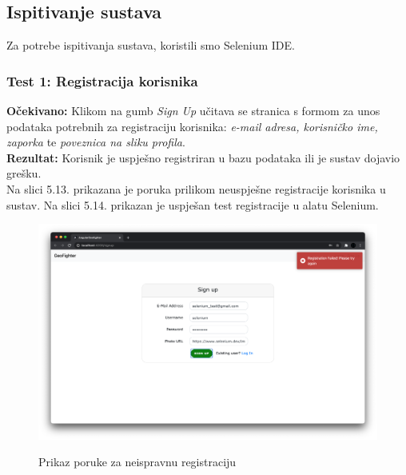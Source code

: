 			\eject
			
			\subsection{Ispitivanje sustava}
			
		    Za potrebe ispitivanja sustava, koristili smo Selenium IDE.
			\subsubsection{Test 1: Registracija korisnika}
			\textbf{Očekivano: } Klikom na gumb \textit{Sign Up} učitava se stranica s formom za unos podataka potrebnih za registraciju korisnika: \textit{e-mail adresa, korisničko ime, zaporka} te \textit{poveznica na sliku profila}.\\
			\textbf{Rezultat: } Korisnik  je  uspješno  registriran  u  bazu  podataka  ili  je  sustav  dojavio grešku.\\
			
			    Na slici 5.13. prikazana je poruka prilikom neuspješne registracije korisnika u sustav. Na slici 5.14. prikazan je uspješan test registracije u alatu Selenium.

			\begin{figure}[H]
				\centering
				\includegraphics[scale=0.27]{dokumentacija/slike/SeleniumRegistrationFail.png} \\
				\caption{ Prikaz poruke za neispravnu registraciju}
				\label{fig:SeleniumRegistrationFail}
			\end{figure}

